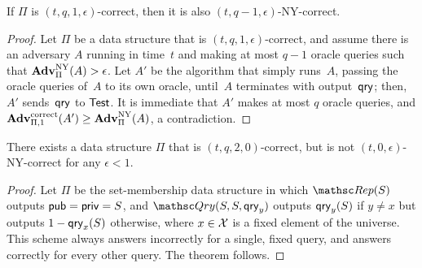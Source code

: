 \begin{theorem}
If $\Pi$ is $(t, q, 1, \epsilon)$-correct, then it is also $(t, q-1, \epsilon)$-NY-correct.
\end{theorem}

\begin{proof}
Let $\Pi$ be a data structure that is $(t,q,1,\epsilon)$-correct,
and assume
there is an adversary $A$ running in time~$t$
and making at most $q-1$ oracle queries such that
$\mathrm{\mathbf{Adv}}^{\mathrm{NY}}_{\Pi}(A) > \epsilon$.
Let $A'$ be the algorithm that simply
runs~$A$, passing the oracle queries of~$A$ to its own oracle, until~$A$ terminates
with output~$\mathsf{qry}$; then, $A'$ sends~$\mathsf{qry}$ to $\mathsf{Test}$. It is immediate that $A'$ makes at most $q$ oracle queries, and
$\mathrm{\mathbf{Adv}}^{\mathrm{correct}}_{\Pi,1}(A') \geq \mathrm{\mathbf{Adv}}^{\mathrm{NY}}_{\Pi}(A)$, a contradiction.
\end{proof}

\begin{theorem}
There exists a data structure $\Pi$ that
is $(t, q, 2, 0)$-correct, but is not $(t, 0, \epsilon)$-NY-correct
for any $\epsilon<1$.
\end{theorem}
\begin{proof}
Let $\Pi$ be the set-membership data structure in which $\Rep(S)$ outputs
${\sf pub}={\sf priv}=S$, and
$\Qry(S, S, \qry_y)$ outputs $\mathsf{qry}_y(S)$ if $y \neq x$ but outputs $1-\mathsf{qry}_x(S)$ otherwise,
where $x \in {\cal X}$ is a fixed element of the universe. This
scheme always answers incorrectly for a single, fixed query, and answers
correctly for every other query. The theorem follows.
\end{proof}

  

